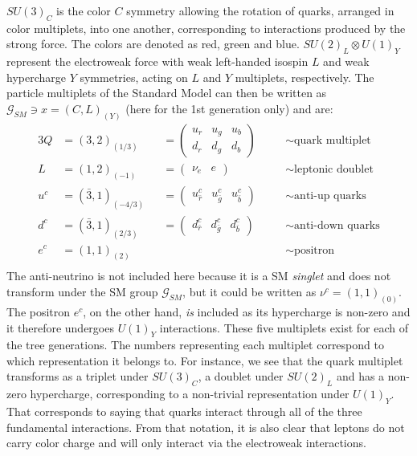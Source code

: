 $SU(3)_C$ is the color $C$ symmetry allowing the rotation of quarks, arranged in color multiplets, into one another, corresponding to interactions produced by the strong force. The colors are denoted as red, green and blue. $SU (2)_L \otimes U(1)_Y$ represent the electroweak force with weak left-handed isospin $L$ and weak hypercharge $Y$ symmetries, acting on $L$ and $Y$ multiplets, respectively. %
The particle multiplets of the Standard Model can then be written as $\mathcal{G}_{SM} \ni x=(C,L)_{(Y)}$ (here for the 1st generation only) and are:
\begin{alignat*}{3}
  \label{eq:theory:multiplets}
Q &= (3,2)_{(1/3)} &&=
  \begin{pmatrix} 
    u_r & u_g & u_b \\
    d_r & d_g & d_b
    \end{pmatrix} \quad  &&\sim \textrm{quark multiplet} \\[1pt]
L &= (1,2)_{(-1)} &&= \begin{pmatrix} \nu_e & e \end{pmatrix} \quad &&\sim \textrm{leptonic doublet} \\[1pt]
u^c &= (\bar{3},1)_{(-4/3)} &&= \begin{pmatrix} u_{\bar{r}}^c & u_{\bar{g}}^c & u_{\bar{b}}^c\end{pmatrix} \quad &&\sim \textrm{anti-up quarks} \\[1pt]
d^c &= (\bar{3},1)_{(2/3)}  &&= \begin{pmatrix} d_{\bar{r}}^c & d_{\bar{g}}^c & d_{\bar{b}}^c\end{pmatrix} \quad &&\sim \textrm{anti-down quarks} \\[1pt]
e^c &= (1,1)_{(2)}          && \quad &&\sim \textrm{positron} \\
\end{alignat*}
The anti-neutrino is not included here because it is a SM \emph{singlet} and does not transform under the SM group $\mathcal{G}_{SM}$, but it could be written as $\nu^c=(1,1)_(0)$. The positron $e^c$, on the other hand, \emph{is} included as its hypercharge is non-zero and it therefore undergoes $U(1)_Y$ interactions. These five multiplets exist for each of the tree generations.\newline
The numbers representing each multiplet correspond to which representation it belongs to. For instance, we see that the quark multiplet transforms as a triplet under $SU(3)_C$, a doublet under $SU(2)_L$ and has a non-zero hypercharge, corresponding to a non-trivial representation under $U(1)_Y$. That corresponds to saying that quarks interact through all of the three fundamental interactions. From that notation, it is also clear that leptons do not carry color charge and will only interact via the electroweak interactions.\newline
